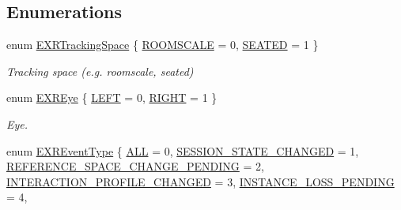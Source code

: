 \subsection*{Enumerations}
\begin{DoxyCompactItemize}
\item 
enum \mbox{\hyperlink{namespace_open_x_r_provider_a005dd91723b05b123b8fccbc41798b05}{E\+X\+R\+Tracking\+Space}} \{ \mbox{\hyperlink{namespace_open_x_r_provider_a005dd91723b05b123b8fccbc41798b05a192dfa44253ba4815ec1a5335f52b578}{R\+O\+O\+M\+S\+C\+A\+LE}} = 0, 
\mbox{\hyperlink{namespace_open_x_r_provider_a005dd91723b05b123b8fccbc41798b05af05478b3d52c3a40a3f66aea7af03dfc}{S\+E\+A\+T\+ED}} = 1
 \}
\begin{DoxyCompactList}\small\item\em Tracking space (e.\+g. roomscale, seated) \end{DoxyCompactList}\item 
enum \mbox{\hyperlink{namespace_open_x_r_provider_a8aa379869e30772896e6c468eb54f155}{E\+X\+R\+Eye}} \{ \mbox{\hyperlink{namespace_open_x_r_provider_a8aa379869e30772896e6c468eb54f155a81ab813676876f34a0aa640d9b3da242}{L\+E\+FT}} = 0, 
\mbox{\hyperlink{namespace_open_x_r_provider_a8aa379869e30772896e6c468eb54f155a6306b44e379151146b66ee8100703cb0}{R\+I\+G\+HT}} = 1
 \}
\begin{DoxyCompactList}\small\item\em Eye. \end{DoxyCompactList}\item 
enum \mbox{\hyperlink{namespace_open_x_r_provider_aa80d286c249d35071f2ff4d19d9dc4c3}{E\+X\+R\+Event\+Type}} \{ \newline
\mbox{\hyperlink{namespace_open_x_r_provider_aa80d286c249d35071f2ff4d19d9dc4c3a6d77b7e96db929c6e81bd4cc00e90b57}{A\+LL}} = 0, 
\mbox{\hyperlink{namespace_open_x_r_provider_aa80d286c249d35071f2ff4d19d9dc4c3a846f256c013f1ddde4f2bfb88c19567d}{S\+E\+S\+S\+I\+O\+N\+\_\+\+S\+T\+A\+T\+E\+\_\+\+C\+H\+A\+N\+G\+ED}} = 1, 
\mbox{\hyperlink{namespace_open_x_r_provider_aa80d286c249d35071f2ff4d19d9dc4c3a8c2148677b3be0b94db1aebff7342f3e}{R\+E\+F\+E\+R\+E\+N\+C\+E\+\_\+\+S\+P\+A\+C\+E\+\_\+\+C\+H\+A\+N\+G\+E\+\_\+\+P\+E\+N\+D\+I\+NG}} = 2, 
\mbox{\hyperlink{namespace_open_x_r_provider_aa80d286c249d35071f2ff4d19d9dc4c3a389520016336a58552b602aacc89d602}{I\+N\+T\+E\+R\+A\+C\+T\+I\+O\+N\+\_\+\+P\+R\+O\+F\+I\+L\+E\+\_\+\+C\+H\+A\+N\+G\+ED}} = 3, 
\newline
\mbox{\hyperlink{namespace_open_x_r_provider_aa80d286c249d35071f2ff4d19d9dc4c3ad2a50c337955d71964454a17b5474740}{I\+N\+S\+T\+A\+N\+C\+E\+\_\+\+L\+O\+S\+S\+\_\+\+P\+E\+N\+D\+I\+NG}} = 4, 

\end{DoxyCompactItemize}
